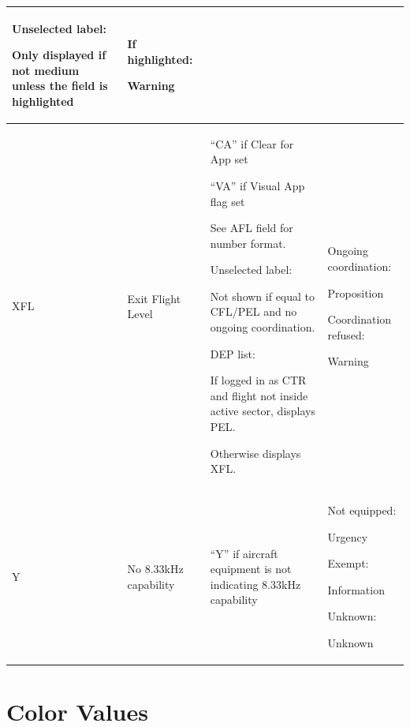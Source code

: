 \documentclass[11pt,a4paper,oldfontcommands]{memoir}
\begin{document}
\begin{longtable}{|p{2.5cm}|p{2.5cm}|p{4.5cm}|p{4.5cm}|}
      Unselected label: 
      
      Only displayed if not medium unless the field is highlighted &
      If highlighted: 
      
      Warning \\ \hline
    XFL &
      Exit Flight Level &
      “CA” if Clear for App set
      
      “VA” if Visual App flag set
      
      See AFL field for number format. 
      \bigskip
      
      Unselected label: 
      
      Not shown if equal to CFL/PEL and  no ongoing coordination. 
      \bigskip
      
      DEP list: 
      
      If logged in as CTR and flight not  inside active sector, displays PEL.  
      
      Otherwise displays XFL. &
      Ongoing coordination:  
      
      Proposition 
      \bigskip
      
      Coordination refused: 
      
      Warning \\ \hline
    Y &
      No 8.33kHz capability &
      “Y” if aircraft equipment is not  indicating 8.33kHz capability &
      Not equipped: 
      
      Urgency 
      \bigskip
      
      Exempt: 
      
      Information 
      \bigskip
      
      Unknown: 
      
      Unknown \\ \hline
    \end{longtable}

\chapter{Color Values}
\end{document}
